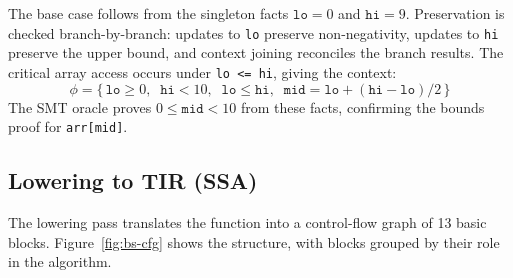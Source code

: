 The base case follows from the singleton facts $\mathtt{lo}=0$ and $\mathtt{hi}=9$. Preservation is checked branch-by-branch: updates to \texttt{lo} preserve non-negativity, updates to \texttt{hi} preserve the upper bound, and context joining reconciles the branch results. The critical array access occurs under \texttt{lo <= hi}, giving the context:
\[
  \phi = \{\, \mathtt{lo} \ge 0, \;\; \mathtt{hi} < 10, \;\; \mathtt{lo} \le \mathtt{hi}, \;\; \mathtt{mid} = \mathtt{lo} + (\mathtt{hi} - \mathtt{lo}) / 2 \,\}
\]
The SMT oracle proves $0 \le \mathtt{mid} < 10$ from these facts, confirming the bounds proof for \texttt{arr[mid]}.

\subsection{Lowering to TIR (SSA)}
The lowering pass translates the function into a control-flow graph of 13 basic blocks. Figure~\ref{fig:bs-cfg} shows the structure, with blocks grouped by their role in the algorithm.
